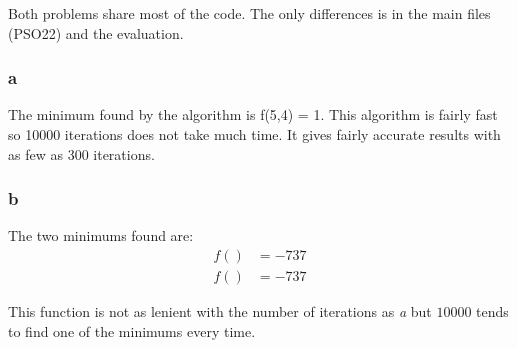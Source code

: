 \documentclass{article}
\begin{document}
Both problems share most of the code. The only differences is in the main files
(PSO22) and the evaluation.

\subsubsection*{a}

The minimum found by the algorithm is f(5,4) = 1. This algorithm is fairly fast
so 10000 iterations does not take much time. It gives fairly accurate results
with as few as 300 iterations.

\subsubsection*{b}

The two minimums found are:
\begin{align*}
  f() &= -737 \\
  f() &= -737
\end{align*}

This function is not as lenient with the number of iterations as \emph{a} but
$10000$ tends to find one of the minimums every time.
\end{document}
